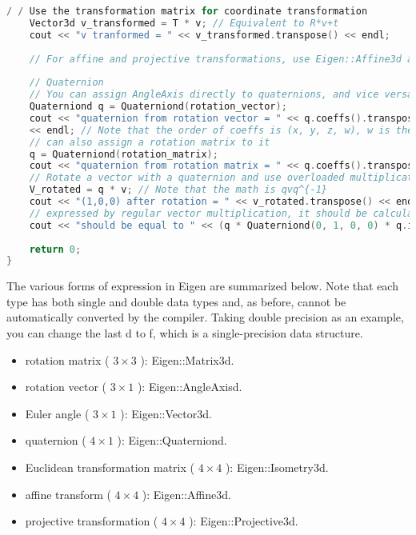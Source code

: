 \begin{lstlisting}[language=c++,caption=slambook2/ch3/useGeometry/useGeometry.cpp]
    / / Use the transformation matrix for coordinate transformation
    Vector3d v_transformed = T * v; // Equivalent to R*v+t
    cout << "v tranformed = " << v_transformed.transpose() << endl;
    
    // For affine and projective transformations, use Eigen::Affine3d and Eigen::Projective3d.
    
    // Quaternion
    // You can assign AngleAxis directly to quaternions, and vice versa
    Quaterniond q = Quaterniond(rotation_vector);
    cout << "quaternion from rotation vector = " << q.coeffs().transpose()
    << endl; // Note that the order of coeffs is (x, y, z, w), w is the real part, the first three are the imaginary part
    // can also assign a rotation matrix to it
    q = Quaterniond(rotation_matrix);
    cout << "quaternion from rotation matrix = " << q.coeffs().transpose() << endl;
    // Rotate a vector with a quaternion and use overloaded multiplication
    V_rotated = q * v; // Note that the math is qvq^{-1}
    cout << "(1,0,0) after rotation = " << v_rotated.transpose() << endl;
    // expressed by regular vector multiplication, it should be calculated as follows
    cout << "should be equal to " << (q * Quaterniond(0, 1, 0, 0) * q.inverse()).coeffs().transpose() << endl;
    
    return 0;
}
\end{lstlisting}

The various forms of expression in Eigen are summarized below. Note that each type has both single and double data types and, as before, cannot be automatically converted by the compiler. Taking double precision as an example, you can change the last d to f, which is a single-precision data structure.
\begin{itemize}
	\item rotation matrix ( $ 3  \times  3 $ ): Eigen::Matrix3d.
	\item rotation vector ( $ 3  \times  1 $ ): Eigen::AngleAxisd.
	\item Euler angle ( $ 3  \times  1 $ ): Eigen::Vector3d.
	\item quaternion ( $ 4  \times  1 $ ): Eigen::Quaterniond.
	\item Euclidean transformation matrix ( $ 4  \times  4 $ ): Eigen::Isometry3d.
	\item affine transform ( $ 4  \times  4 $ ): Eigen::Affine3d.
	\item projective transformation ( $ 4  \times  4 $ ): Eigen::Projective3d.
\end{itemize}

